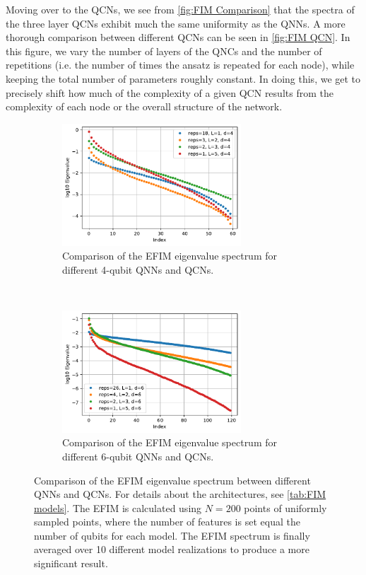 Moving over to the QCNs, we see from \autoref{fig:FIM Comparison} that the spectra of the three layer QCNs exhibit much the same uniformity as the QNNs. A more thorough comparison between different QCNs can be seen in \autoref{fig:FIM QCN}. In this figure, we vary the number of layers of the QNCs and the number of repetitions (i.e. the number of times the ansatz is repeated for each node), while keeping the total number of parameters roughly constant. In doing this, we get to precisely shift how much of the complexity of a given QCN results from the complexity of each node or the overall structure of the network.

\begin{figure}[H]
    \centering
    \begin{subfigure}[t]{0.45\textwidth}
        \centering
        \includegraphics[height=1.8in]{latex/figures/FIM_qubits_4_comparison.pdf}
        \caption{Comparison of the EFIM eigenvalue spectrum for different 4-qubit QNNs and QCNs.}
        \label{fig:FIM QCN a}
    \end{subfigure}%
    ~ 
    \begin{subfigure}[t]{0.45\textwidth}
        \centering
        \includegraphics[height=1.8in]{latex/figures/FIM_qubits_6_comparison.pdf}
        \caption{Comparison of the EFIM eigenvalue spectrum for different 6-qubit QNNs and QCNs.}
        \label{fig:FIM QCN b}
    \end{subfigure}
    \caption{Comparison of the EFIM eigenvalue spectrum between different QNNs and QCNs. For details about the architectures, see \autoref{tab:FIM models}. The EFIM is calculated using $N=200$ points of uniformly sampled points, where the number of features is set equal the number of qubits for each model. The EFIM spectrum is finally averaged over 10 different model realizations to produce a more significant result.}
    \label{fig:FIM QCN}
\end{figure}

